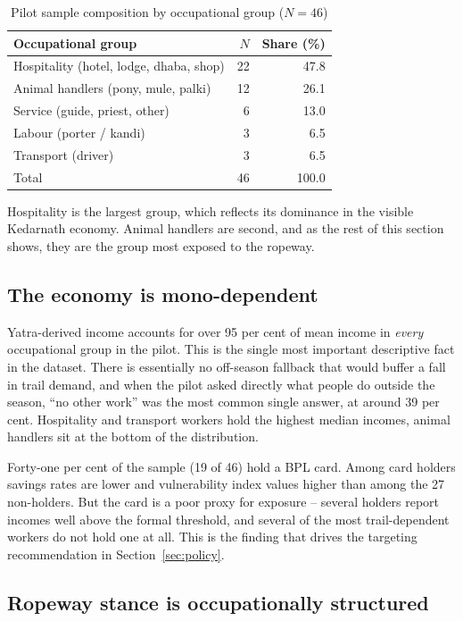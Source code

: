 \documentclass[11pt]{article}
\begin{document}
\begin{table}[h]
\centering
\caption{Pilot sample composition by occupational group ($N=46$)}
\begin{tabular}{lrr}
\toprule
Occupational group & $N$ & Share (\%) \\
\midrule
Hospitality (hotel, lodge, dhaba, shop) & 22 & 47.8 \\
Animal handlers (pony, mule, palki)     & 12 & 26.1 \\
Service (guide, priest, other)          &  6 & 13.0 \\
Labour (porter / kandi)                 &  3 &  6.5 \\
Transport (driver)                      &  3 &  6.5 \\
\midrule
Total & 46 & 100.0 \\
\bottomrule
\end{tabular}
\end{table}

Hospitality is the largest group, which reflects its dominance in the visible Kedarnath
economy. Animal handlers are second, and as the rest of this section shows, they are the group
most exposed to the ropeway.

\subsection{The economy is mono-dependent}

Yatra-derived income accounts for over 95 per cent of mean income in \emph{every} occupational
group in the pilot. This is the single most important descriptive fact in the dataset. There
is essentially no off-season fallback that would buffer a fall in trail demand, and when the
pilot asked directly what people do outside the season, ``no other work'' was the most common
single answer, at around 39 per cent. Hospitality and transport workers hold the highest
median incomes, animal handlers sit at the bottom of the distribution.

Forty-one per cent of the sample (19 of 46) hold a BPL card. Among card holders savings rates
are lower and vulnerability index values higher than among the 27 non-holders. But the card
is a poor proxy for exposure -- several holders report incomes well above the formal
threshold, and several of the most trail-dependent workers do not hold one at all. This is the
finding that drives the targeting recommendation in Section~\ref{sec:policy}.

\subsection{Ropeway stance is occupationally structured}
\end{document}
